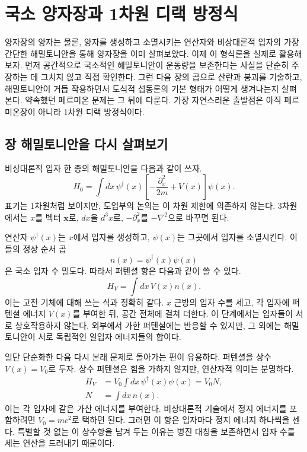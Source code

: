 \chapter{국소 양자장과 1차원 디랙 방정식}

양자장의 양자는 물론, 양자를 생성하고 소멸시키는 연산자와 비상대론적 입자의 가장 간단한 해밀토니안을 통해 양자장을 이미 살펴보았다. 이제 이 형식론을 실제로 활용해 보자. 먼저 공간적으로 국소적인 해밀토니안이 운동량을 보존한다는 사실을 단순히 주장하는 데 그치지 않고 직접 확인한다. 그런 다음 장의 곱으로 산란과 붕괴를 기술하고, 해밀토니안이 거듭 작용하면서 도식적 섭동론의 기본 형태가 어떻게 생겨나는지 살펴본다. 약속했던 페르미온 문제는 그 뒤에 다룬다. 가장 자연스러운 출발점은 아직 페르미온장이 아니라 1차원 디랙 방정식이다.

\section{장 해밀토니안을 다시 살펴보기}

비상대론적 입자 한 종의 해밀토니안을 다음과 같이 쓰자.
\begin{equation}
H_0=\int dx\,
\psi^\dagger(x)
\left[-\frac{\partial_x^2}{2m}+V(x)\right]
\psi(x).
\label{eq:l9-nonrel-hamiltonian}
\end{equation}
표기는 1차원처럼 보이지만, 도입부의 논의는 이 차원 제한에 의존하지 않는다. 3차원에서는 \(x\)를 벡터 \(\mathbf{x}\)로, \(dx\)을 \(d^3x\)로, \(-\partial_x^2\)를 \(-\nabla^2\)으로 바꾸면 된다.

연산자 \(\psi^\dagger(x)\)는 \(x\)에서 입자를 생성하고, \(\psi(x)\)는 그곳에서 입자를 소멸시킨다. 이들의 정상 순서 곱
\begin{equation}
n(x)=\psi^\dagger(x)\psi(x)
\end{equation}
은 국소 입자 수 밀도다. 따라서 퍼텐셜 항은 다음과 같이 쓸 수 있다.
\begin{equation}
H_V=\int dx\,V(x)n(x).
\end{equation}
이는 고전 기체에 대해 쓰는 식과 정확히 같다. \(x\) 근방의 입자 수를 세고, 각 입자에 퍼텐셜 에너지 \(V(x)\)를 부여한 뒤, 공간 전체에 걸쳐 더한다. 이 단계에서는 입자들이 서로 상호작용하지 않는다. 외부에서 가한 퍼텐셜에는 반응할 수 있지만, 그 외에는 해밀토니안이 서로 독립적인 일입자 에너지들의 합이다.

일단 단순화한 다음 다시 본래 문제로 돌아가는 편이 유용하다. 퍼텐셜을 상수 \(V(x)=V_0\)로 두자. 상수 퍼텐셜은 힘을 가하지 않지만, 연산자적 의미는 분명하다.
\begin{equation}
\begin{aligned}
H_V&=V_0\int dx\,\psi^\dagger(x)\psi(x)=V_0N,\\
N&=\int dx\,n(x).
\end{aligned}
\end{equation}
이는 각 입자에 같은 가산 에너지를 부여한다. 비상대론적 기술에서 정지 에너지를 포함하려면 \(V_0=mc^2\)로 택하면 된다. 그러면 이 항은 입자마다 정지 에너지 하나씩을 센다. 특별할 것 없는 이 상수항을 남겨 두는 이유는 병진 대칭을 보존하면서 입자 수를 세는 연산을 드러내기 때문이다.

